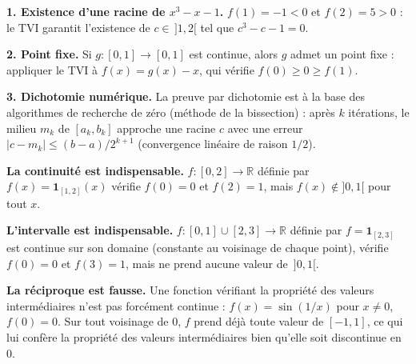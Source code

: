\decsep{}



\begin{mdframed}[style=exbar]
  \textbf{1. Existence d'une racine de $x^3 - x - 1$.}\enspace%
  $f(1) = -1 < 0$ et $f(2) = 5 > 0$ : le TVI garantit l'existence de
  $c \in\, ]1,2[$ tel que $c^3 - c - 1 = 0$.

  \smallskip\noindent
  \textbf{2. Point fixe.}\enspace%
  Si $g : [0,1] \to [0,1]$ est continue, alors $g$ admet un point fixe :
  appliquer le TVI à $f(x) = g(x) - x$, qui vérifie $f(0) \geq 0 \geq f(1)$.

  \smallskip\noindent
  \textbf{3. Dichotomie numérique.}\enspace%
  La preuve par dichotomie est à la base des algorithmes de recherche de zéro
  (méthode de la bissection) : après $k$ itérations, le milieu $m_k$ de
  $[a_k, b_k]$ approche une racine $c$ avec une erreur
  $|c - m_k| \leq (b-a)/2^{k+1}$ (convergence linéaire de raison $1/2$).
\end{mdframed}


\begin{mdframed}[style=cexbar]
  \textbf{La continuité est indispensable.}\enspace%
  $f : [0,2] \to \mathbb{R}$ définie par $f(x) = \mathbf{1}_{[1,2]}(x)$
  vérifie $f(0) = 0$ et $f(2) = 1$, mais $f(x) \notin ]0,1[$ pour tout $x$.

  \smallskip\noindent
  \textbf{L'intervalle est indispensable.}\enspace%
  $f : [0,1] \cup [2,3] \to \mathbb{R}$ définie par $f = \mathbf{1}_{[2,3]}$
  est continue sur son domaine (constante au voisinage de chaque point),
  vérifie $f(0) = 0$ et $f(3) = 1$, mais ne prend aucune valeur de
  $\,]0,1[$.

  \smallskip\noindent
  \textbf{La réciproque est fausse.}\enspace%
  Une fonction vérifiant la propriété des valeurs intermédiaires n'est pas
  forcément continue : $f(x) = \sin(1/x)$ pour $x \neq 0$, $f(0) = 0$.
  Sur tout voisinage de $0$, $f$ prend déjà toute valeur de $[-1,1]$, ce qui lui
  confère la propriété des valeurs intermédiaires bien qu'elle soit discontinue en $0$.
\end{mdframed}

\vspace{6pt}
\exolabel

